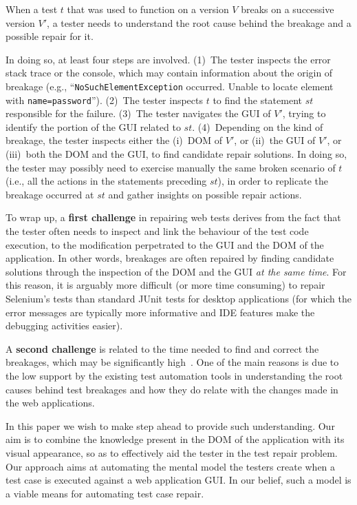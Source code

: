 When a test $t$ that was used to function on a version $V$  breaks on a successive version $V'$, a tester needs to understand the root cause behind the breakage and a possible repair for it. 

In doing so, at least four steps are involved. 
(1)~The tester inspects the error stack trace or the console, which may contain information about the origin of breakage (e.g., ``\texttt{NoSuchElementException} occurred. Unable to locate element with \mbox{\texttt{name=password}}''). 
(2)~The tester inspects $t$ to find the statement $st$ responsible for the failure. %
(3)~The tester navigates the GUI of $V'$, trying to identify the portion of the GUI related to $st$. 
(4)~Depending on the kind of breakage, the tester inspects either the (i)~DOM of $V'$, or (ii)~the GUI of $V'$, or (iii)~both the DOM and the GUI, to find candidate repair solutions. In doing so, the tester may possibly need to exercise manually the same broken scenario of $t$ (i.e., all the actions in the statements preceding $st$), in order to replicate the breakage occurred at $st$ and gather insights on possible repair actions.

To wrap up, a \textbf{first challenge} in repairing web tests derives from the fact that  
the tester often needs to inspect and link the behaviour of the test code execution, to the modification perpetrated to the GUI and the DOM of the application. 
In other words, breakages are often repaired by finding candidate solutions through the inspection of the DOM and the GUI \textit{at the same time}.
For this reason, it is arguably more difficult (or more time consuming) to repair Selenium's tests than standard JUnit tests for desktop applications (for which the error messages are typically more informative and IDE features make the debugging activities easier).

A \textbf{second challenge} is related to the time needed to find and correct the breakages, which may be significantly high~\cite{Leotta-TAIC-2013,JAMAICA2013}. One of the main reasons is due to the low support by the existing test automation tools in understanding the root causes behind test breakages and how they do relate with the changes made in the web applications. 

In this paper we wish to make step ahead to provide such understanding. 
Our aim is to combine the knowledge present in the DOM of the application with its visual appearance, so as to effectively aid the tester in the test repair problem. Our approach aims at automating the mental model the testers create when a test case is executed against a web application GUI. In our belief, such a model is a viable means for automating test case repair.


